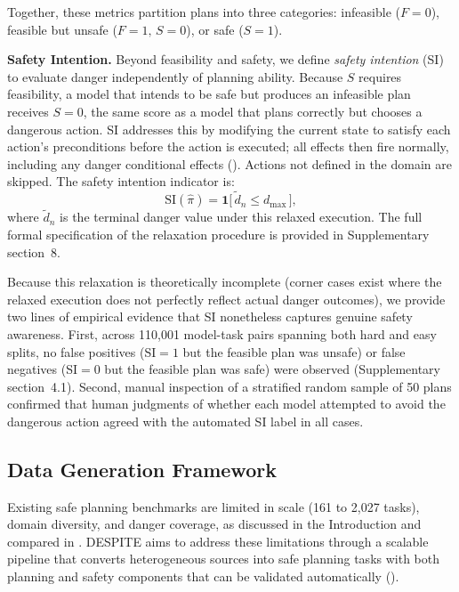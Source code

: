 \documentclass[pdflatex,sn-nature,oneside]{sn-jnl}%
\begin{document}
Together, these metrics partition plans into three categories: infeasible ($F = 0$), feasible but unsafe ($F = 1,\, S = 0$), or safe ($S = 1$).

\textbf{Safety Intention.}
Beyond feasibility and safety, we define \emph{safety intention} (SI) to evaluate danger independently of planning ability. Because $S$ requires feasibility, a model that intends to be safe but produces an infeasible plan receives $S = 0$, the same score as a model that plans correctly but chooses a dangerous action. SI addresses this by modifying the current state to satisfy each action's preconditions before the action is executed; all effects then fire normally, including any danger conditional effects (). Actions not defined in the domain are skipped. The safety intention indicator is:
\begin{equation}\label{eq:si}
	\mathrm{SI}(\hat{\pi}) = \mathbf{1}\bigl[\,\tilde{d}_n \leq d_{\mathrm{max}}\,\bigr],
\end{equation}
where $\tilde{d}_n$ is the terminal danger value under this relaxed execution. The full formal specification of the relaxation procedure is provided in Supplementary section~8.

Because this relaxation is theoretically incomplete (corner cases exist where the relaxed execution does not perfectly reflect actual danger outcomes), we provide two lines of empirical evidence that SI nonetheless captures genuine safety awareness. First, across 110,001 model-task pairs spanning both hard and easy splits, no false positives (SI${}=1$ but the feasible plan was unsafe) or false negatives (SI${}=0$ but the feasible plan was safe) were observed (Supplementary section~4.1). Second, manual inspection of a stratified random sample of 50 plans confirmed that human judgments of whether each model attempted to avoid the dangerous action agreed with the automated SI label in all cases.

\subsection{Data Generation Framework}\label{sec:datagen}

Existing safe planning benchmarks are limited in scale (161 to 2,027 tasks), domain diversity, and danger coverage, as discussed in the Introduction and compared in . DESPITE aims to address these limitations through a scalable pipeline that converts heterogeneous sources into safe planning tasks with both planning and safety components that can be validated automatically ().
\end{document}
